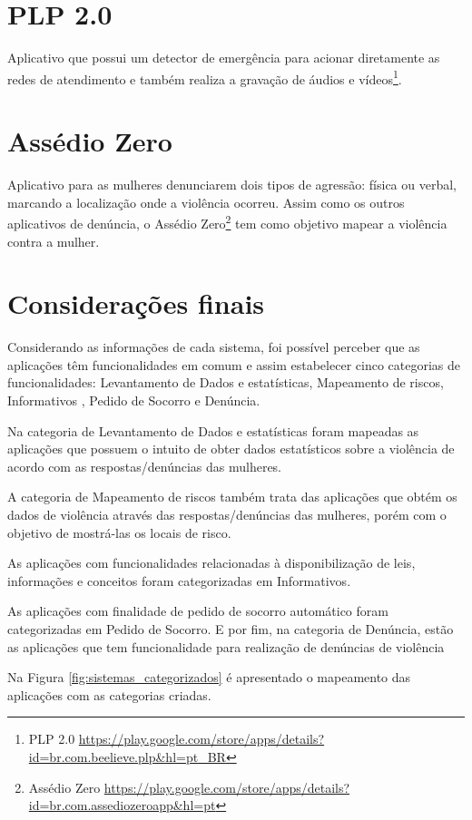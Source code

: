 \section*{PLP 2.0}

Aplicativo que possui um detector de emergência para acionar diretamente as redes de atendimento 
e também realiza a gravação de áudios e vídeos\footnote{PLP 2.0 \url{https://play.google.com/store/apps/details?id=br.com.beelieve.plp&hl=pt_BR}}.

\section*{Assédio Zero}

Aplicativo para as mulheres denunciarem dois tipos de agressão: física ou verbal, marcando a localização 
onde a violência ocorreu. Assim como os outros aplicativos de denúncia, o Assédio Zero\footnote{Assédio Zero \url{https://play.google.com/store/apps/details?id=br.com.assediozeroapp&hl=pt}} tem como objetivo mapear a violência contra a mulher.

\section{Considerações finais}

Considerando as informações de cada sistema, foi possível perceber que as aplicações têm funcionalidades
em comum e assim estabelecer cinco categorias de funcionalidades: Levantamento de Dados e estatísticas, Mapeamento de riscos, Informativos , Pedido de Socorro e Denúncia. 

Na categoria de Levantamento de Dados e estatísticas foram mapeadas as aplicações que possuem
o intuito de obter dados estatísticos sobre a violência de acordo com as respostas/denúncias das mulheres.

A categoria de Mapeamento de riscos também trata das aplicações que obtém os dados de violência através
das respostas/denúncias das mulheres, porém com o objetivo de mostrá-las os locais de risco.

As aplicações com funcionalidades relacionadas à disponibilização de leis, informações e conceitos foram
categorizadas em Informativos.

As aplicações com finalidade de pedido de socorro automático foram categorizadas em Pedido de Socorro. E por fim, na categoria de Denúncia, estão as aplicações que tem funcionalidade para realização de denúncias de violência

Na Figura \ref{fig:sistemas_categorizados} é apresentado o mapeamento das aplicações com as categorias criadas.

